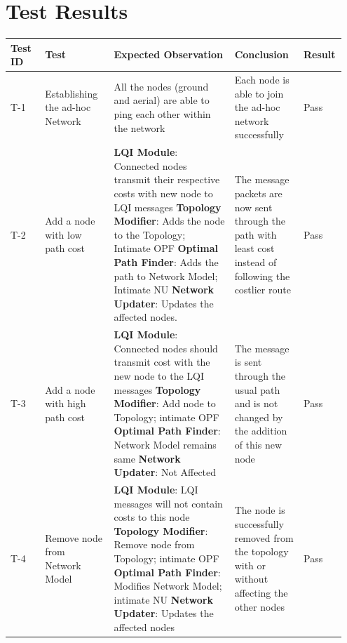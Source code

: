\documentclass{article}
\begin{document}
\section{Test Results}
{\renewcommand{\arraystretch}{1.5}
\begin{longtable}{  | p{0.1\linewidth} | p{0.2\linewidth} | p{0.35\linewidth} | p{0.2\linewidth} | p{0.1\linewidth} | }
\hline
\textbf{Test ID} & \textbf{Test} & \textbf{Expected Observation} & \textbf{Conclusion} & \textbf{Result} \\ 
\hline \hline
T-1 & Establishing the ad-hoc Network & All the nodes (ground and aerial) are able to ping each other within the network
& Each node is able to join the ad-hoc network successfully & Pass \\
\hline
T-2 & 
Add a node with low path cost & 
\textbf{LQI Module}: Connected nodes transmit their respective costs with new node to LQI messages \newline 
\textbf{Topology Modifier}: Adds the node to the Topology; Intimate OPF \newline 
\textbf{Optimal Path Finder}: Adds the path to Network Model; Intimate NU \newline
\textbf{Network Updater}: Updates the affected nodes. &
The message packets are now sent through the path with least cost instead of following the costlier route &
Pass \\
\hline
T-3 & 
Add a node with high path cost & 
\textbf{LQI Module}: Connected nodes should transmit cost with the new node to the LQI messages\newline 
\textbf{Topology Modifier}: Add node to Topology; intimate OPF\newline 
\textbf{Optimal Path Finder}: Network Model remains same\newline
\textbf{Network Updater}: Not Affected &
The message is sent through the usual path and is not changed by the addition of this new node &
Pass\\
\hline
T-4 & 
Remove node from Network Model & 
\textbf{LQI Module}: LQI messages will not contain costs to this node\newline 
\textbf{Topology Modifier}: Remove node from Topology; intimate OPF \newline 
\textbf{Optimal Path Finder}: Modifies Network Model; intimate NU \newline
\textbf{Network Updater}: Updates the affected nodes &
The node is successfully removed from the topology with or without affecting the other nodes &
Pass\\

\end{longtable}}
\end{document}
